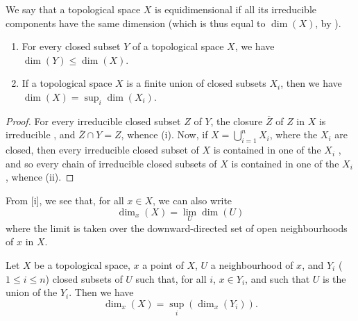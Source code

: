\begin{defn}[14.1.3]
\label{0.14.1.3}
We say that a topological space $X$ is equidimensional if all its irreducible components have the same dimension (which is thus equal to $\dim(X)$, by ).
\end{defn}

\begin{prop}[14.1.4]
\label{0.14.1.4}
\medskip\noindent
\begin{enumerate}[label=\emph{(\roman*)}]
    \item For every closed subset $Y$ of a topological space $X$, we have $\dim(Y)\leq\dim(X)$.
    \item If a topological space $X$ is a finite union of closed subsets $X_i$, then we have $\dim(X)=\sup_i\dim(X_i)$.
\end{enumerate}
\end{prop}

\begin{proof}
\label{proof-0.14.1.4}
For every irreducible closed subset $Z$ of $Y$, the closure $\overline{Z}$ of $Z$ in $X$ is irreducible , and $\overline{Z}\cap Y=Z$, whence (i).
Now, if $X=\bigcup_{i=1}^nX_i$, where the $X_i$ are closed, then every irreducible closed subset of $X$ is contained in one of the $X_i$ , and so every chain of irreducible closed subsets of $X$ is contained in one of the $X_i$, whence (ii).
\end{proof}

From [i], we see that, for all $x\in X$, we can also write
\begin{equation*}
\label{0.14.1.4.1}
    \dim_x(X) = \lim_U\dim(U)\tag{14.1.4.1}
\end{equation*}
where the limit is taken over the downward-directed set of open neighbourhoods of $x$ in $X$.


\begin{cor}[14.1.5]
\label{0.14.1.5}
Let $X$ be a topological space, $x$ a point of $X$, $U$ a neighbourhood of $x$, and $Y_i$ ($1\leq i\leq n$) closed subsets of $U$ such that, for all $i$, $x\in Y_i$, and such that $U$ is the union of the $Y_i$.
Then we have
\begin{equation*}
\label{0.14.1.5.1}
    \dim_x(X) = \sup_i(\dim_x(Y_i)).\tag{14.1.5.1}
\end{equation*}
\end{cor}


